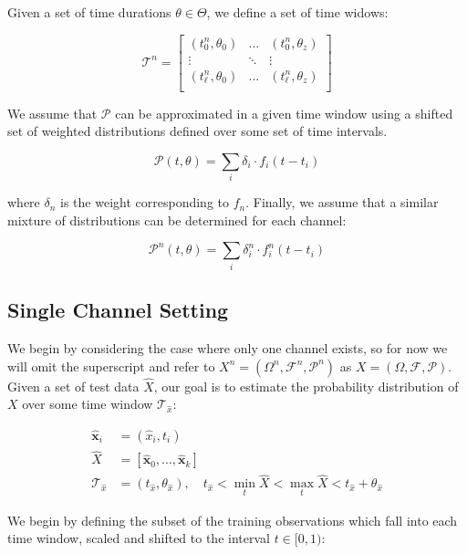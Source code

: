 \documentclass[10pt]{article}
\begin{document}
Given a set of time durations \( \theta \in \Theta \), we define a set of time widows:

\[  \mathcal{T}^n =  
\begin{bmatrix} 
(t_0^n,\theta_0) & \hdots & (t_0^n,\theta_z) \\
\vdots & \ddots & \vdots \\
(t_\ell^n, \theta_0) & \hdots & (t_\ell^n, \theta_z) \\
\end{bmatrix} 
\]

We assume that \( \mathcal{P} \) can be approximated in a given time window using a shifted set of weighted distributions defined over some set of time intervals.

\begin{equation} \mathcal{P}(t,\theta) = \sum_i \delta_i \cdot f_i(t - t_i) \end{equation}

where \( \delta_n \) is the weight corresponding to \( f_n \).  Finally, we assume that a similar mixture of distributions can be determined for each channel:

\begin{equation} \mathcal{P}^n(t,\theta) = \sum_i \delta_i^n \cdot f_i^n(t - t_i) \end{equation}

\subsection{Single Channel Setting}
We begin by considering the case where only one channel exists, so for now we will omit the superscript and refer to \(X^n = (\Omega^n,\mathcal{F}^n,\mathcal{P}^n) \) as \(X = (\Omega, \mathcal{F},\mathcal{P}) \).  Given a set of test data \( \hat{X} \), our goal is to estimate the probability distribution of \( X \) over some time window \( \mathcal{T}_{\hat{x}} \):

\begin{align*}
\mathbf{\hat{x}}_i &= (\hat{x}_i,t_i) \\
\hat{X} &= [ \mathbf{\hat{x}}_0,\hdots,\mathbf{\hat{x}}_k ] \\
\mathcal{T}_{\hat{x}} &= (t_{\hat{x}}, \theta_{\hat{x}} ), \quad t_{\hat{x}} < \min_t \hat{X} < \max_t \hat{X} < t_{\hat{x}} + \theta_{\hat{x}}
\end{align*}

We begin by defining the subset of the training observations which fall into each time window, scaled and shifted to the interval \( t \in [0,1) \):
\end{document}
